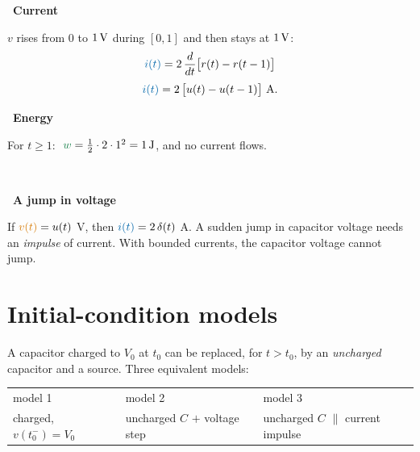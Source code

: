 \documentclass[11pt,a4paper]{article}
\newcommand{\Icol}[1]{\textcolor{ccur}{#1}}
\newcommand{\Vcol}[1]{\textcolor{cvolt}{#1}}
\newcommand{\Pcol}[1]{\textcolor{cpow}{#1}}
\newif\ifsolfirst
\newcommand{\solstep}[2]{\par\ifsolfirst\global\solfirstfalse\else\bigskip\fi
  \noindent{\color{cpow}\bfseries Step #1.}\ {\bfseries #2}\par\nobreak\smallskip}
\newcommand{\Jl}{\,\mathrm{J}}
\newcommand{\Vo}{V_0}
\newcommand{\tax}[6]{\draw[vax] (#1,0) -- (#2,0) node[right, font=\small] {#5};
  \draw[vax] (0,#3) -- (0,#4) node[above, font=\small] {#6};}
\newcommand{\xt}[2]{\draw ([yshift=2pt]#1,0) -- ([yshift=-2pt]#1,0) node[below, font=\scriptsize] {#2};}
\newcommand{\yt}[2]{\draw ([xshift=2pt]0,#1) -- ([xshift=-2pt]0,#1) node[left, font=\scriptsize] {#2};}
\newcommand{\icModel}[1]{%
  \ifcase#1\or
    \draw (0,2.4) node[ocirc] {} to[C, l=$C$] (0,0) node[ocirc] {};
    \node[pol] at (-0.5,2.0) {$+$}; \node[pol] at (-0.5,0.4) {$-$};
    \node[font=\small, text=cvolt] at (-0.6,1.2) {$v$};
    \node[font=\scriptsize, align=center] at (0,-0.55) {$v(t_0^-) = \Vo$};
  \or
    \draw (0,2.4) node[ocirc] {} to[C, l=$C$] (0,1.2) to[american voltage source, l=$\Vo\,u(t - t_0)$] (0,-0.4) node[ocirc] {};
    \node[pol] at (-0.5,2.0) {$+$}; \node[pol] at (-0.5,0) {$-$};
    \node[font=\small, text=cvolt] at (-0.6,1.0) {$v$};
    \node[font=\scriptsize, align=center] at (0,-0.95) {uncharged};
  \or
    \draw (0,2.4) node[ocirc] {} -- (2.9,2.4); \draw (0,0) node[ocirc] {} -- (2.9,0);
    \draw (1.0,2.4) to[C, l=$C$] (1.0,0);
    \draw (2.9,0) to[american current source, l_=$C\Vo\,\delta(t - t_0)$] (2.9,2.4);
    \fill (1.0,0) circle (1.6pt); \fill (1.0,2.4) circle (1.6pt);
    \node[pol] at (-0.35,2.0) {$+$}; \node[pol] at (-0.35,0.4) {$-$};
    \node[font=\small, text=cvolt] at (-0.4,1.2) {$v$};
    \node[font=\scriptsize, align=center] at (1.4,-0.55) {uncharged};
  \fi}
\begin{document}
\begin{minipage}[c]{0.52\linewidth}
\solstep{1}{Current}
$v$ rises from $0$ to $1\,\mathrm{V}$ during $[0, 1]$ and then stays at $1\,\mathrm{V}$:
\[
  \Icol{i(t)} = 2\,\frac{d}{dt}\big[r(t) - r(t - 1)\big]
\]
\[
  \Icol{i(t)} = 2\,\big[u(t) - u(t - 1)\big] \ \mathrm{A}.
\]
\solstep{2}{Energy}
For $t \geq 1$: $\ \Pcol{w} = \tfrac12 \cdot 2 \cdot 1^2 = 1\Jl$, and no current flows.
\end{minipage}\hfill
\begin{minipage}[c]{0.44\linewidth}
\centering
{}\\[4pt]
\end{minipage}

\solstep{3}{A jump in voltage}
If $\Vcol{v(t)} = u(t)$ V, then $\Icol{i(t)} = 2\,\delta(t)$ A. A sudden jump in capacitor
voltage needs an \emph{impulse} of current. With bounded currents, the capacitor voltage cannot
jump.

\section{Initial-condition models}

A capacitor charged to $\Vo$ at $t_0$ can be replaced, for $t > t_0$, by an \emph{uncharged}
capacitor and a source. Three equivalent models:

\begin{center}
\hspace{0.6cm}\raisebox{1cm}{$\equiv$}\hspace{0.6cm}
\hspace{0.9cm}\raisebox{1cm}{$\equiv$}\hspace{0.4cm}
\end{center}
\begin{center}
\small
\begin{tabular}{@{}lll@{}}
model 1 & model 2 & model 3\\
charged, $v(t_0^-) = \Vo$ & uncharged $C$ $+$ voltage step & uncharged $C$ $\parallel$ current impulse
\end{tabular}
\end{center}
\end{document}
